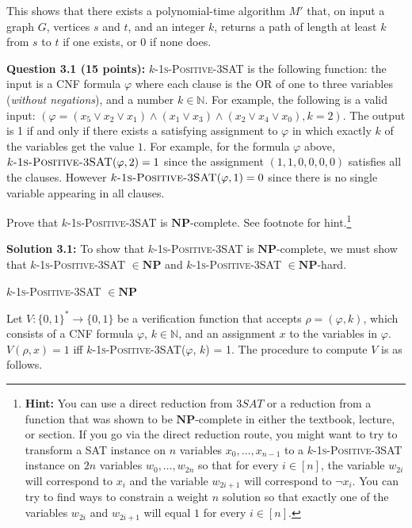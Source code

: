 \documentclass[11pt]{article}
\begin{document}
This shows that there exists a polynomial-time algorithm $M'$ that, on input a graph $G$, vertices $s$ and $t$, and an integer $k$, returns a path of length at least $k$ from $s$ to $t$ if one exists, or 0 if none does.

\newpage

\textbf{Question 3.1 (15 points):} \textsc{$k$-1s-Positive-3SAT} is the following
function: the input is a CNF formula \(\varphi\) where each clause is
the OR of one to three variables (\emph{without negations}), and a
number \(k\in \mathbb{N}\). For example, the following is a valid input:
\(\left(\varphi = (x_5 \vee x_{2} \vee x_1) \wedge (x_1 \vee x_3) \wedge (x_2 \vee x_4 \vee x_0), k = 2\right)\).
The output is 1 if and only if there exists a
satisfying assignment to \(\varphi\) in which exactly \(k\) of the
variables get the value \(1\). For example, for the formula \(\varphi\)
above, \(\textsc{$k$-1s-Positive-3SAT}(\varphi,2)=1\) since the assignment \((1,1,0,0,0,0)\)
satisfies all the clauses. However \(\textsc{$k$-1s-Positive-3SAT}(\varphi,1)=0\) since there is
no single variable appearing in all clauses.

Prove that \textsc{$k$-1s-Positive-3SAT} is \(\mathbf{NP}\)-complete. See footnote for
hint.\footnote{\textbf{Hint:} You can use a direct reduction from
	\(3SAT\) or a reduction from a function that was shown to be
	\(\mathbf{NP}\)-complete in either the textbook, lecture, or section.
	If you go via the direct reduction route, you might want to try to
	transform a SAT instance on \(n\) variables \(x_0,\ldots,x_{n-1}\) to
	a \textsc{$k$-1s-Positive-3SAT} instance on \(2n\) variables \(w_0,\ldots,w_{2n}\) so that for
	every \(i\in [n]\), the variable \(w_{2i}\) will correspond to \(x_i\)
	and the variable \(w_{2i+1}\) will correspond to \(\neg x_i\). You can
	try to find ways to constrain a weight \(n\) solution so that exactly
	one of the variables \(w_{2i}\) and \(w_{2i+1}\) will equal \(1\) for
	every \(i \in [n]\).}

\textbf{Solution 3.1:}
To show that \textsc{$k$-1s-Positive-3SAT} is \(\mathbf{NP}\)-complete, we must show that \textsc{$k$-1s-Positive-3SAT} $\in \mathbf{NP}$ and \textsc{$k$-1s-Positive-3SAT} $\in \mathbf{NP}$-hard.

\textsc{$k$-1s-Positive-3SAT} $\in \mathbf{NP}$

Let $V: \{0, 1\}^* \to \{0, 1\}$ be a verification function that accepts $\rho = (\varphi, k)$, which consists of a CNF formula $\varphi$, $k\in \mathbb{N}$, and an assignment $x$ to the variables in $\varphi$. $V(\rho, x) = 1$ iff \textsc{$k$-1s-Positive-3SAT}($\varphi$, $k$) = 1. The procedure to compute $V$ is as follows.
\end{document}
